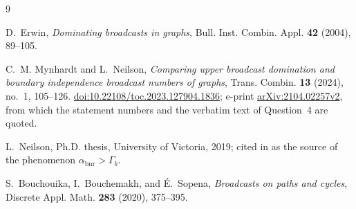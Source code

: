 \documentclass[11pt]{amsart}
\theoremstyle{remark}
\DeclareMathOperator{\bnr}{bnr}
\newcommand{\abnr}{\alpha_{\bnr}}
\newcommand{\Gb}{\Gamma_{b}}
\begin{document}
\begin{thebibliography}{9}

D.~Erwin,
\emph{Dominating broadcasts in graphs},
Bull. Inst. Combin. Appl. \textbf{42} (2004), 89--105.

C.~M. Mynhardt and L.~Neilson,
\emph{Comparing upper broadcast domination and boundary independence broadcast
numbers of graphs},
Trans. Combin. \textbf{13} (2024), no.~1, 105--126.
\href{https://doi.org/10.22108/toc.2023.127904.1836}{doi:10.22108/toc.2023.127904.1836};
e-print \href{https://arxiv.org/abs/2104.02257v2}{arXiv:2104.02257v2}, from
which the statement numbers and the verbatim text of Question~4 are quoted.

L.~Neilson,
Ph.D. thesis, University of Victoria, 2019; cited in \cite{MN24} as the source
of the phenomenon $\abnr>\Gb$.

S.~Bouchouika, I.~Bouchemakh, and \'E.~Sopena,
\emph{Broadcasts on paths and cycles},
Discrete Appl. Math. \textbf{283} (2020), 375--395.

\end{thebibliography}
\end{document}
